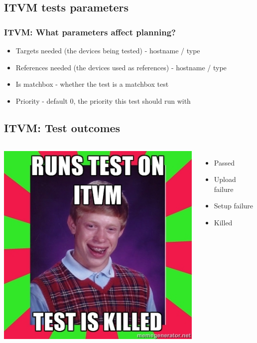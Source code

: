 \documentclass[xcolor=pdftex,dvipsnames,table]{beamer}
\begin{document}
\subsection{ITVM tests parameters}
\begin{frame}
  \frametitle{ITVM: What parameters affect planning?}
  \begin{itemize}
    \item Targets needed (the devices being tested) - hostname / type
    \item References needed (the devices used as references) -
      hostname / type
    \item Is matchbox - whether the test is a matchbox test
    \item Priority - default 0, the priority this test should run with
  \end{itemize}
\end{frame}

\subsection{ITVM: Test outcomes}
\begin{frame}
  \begin{columns}[cc]
  \column{1.5in}
  \includegraphics[scale=0.33]{brian.jpg}
  \column{1.5in}
  \begin{itemize}
    \item Passed
    \item Upload failure
    \item Setup failure
    \item Killed
  \end{itemize}
  \end{columns}
\end{frame}
\end{document}
